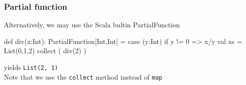 \documentclass{beamer}
\newcommand{\beb}{\begin{exampleblock}}
\newcommand{\eeb}{\end{exampleblock}}
\begin{document}
\begin{frame}[fragile]
\frametitle{Partial function}
Alternatively, we may use the Scala bultin PartialFunction 
\beb{}
\begin{code}
def div(x:Int): PartialFunction[Int,Int] = {
    case (y:Int) if y != 0 => x/y
}
val xs = List(0,1,2) collect ( div(2) ) 
\end{code}
\eeb
yields {\tt List(2, 1)} \\ 
Note that we use the {\tt collect} method instead of {\tt map}
\end{frame}
\end{document}

